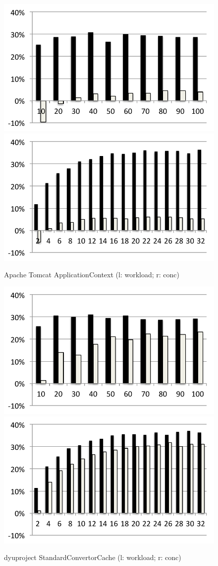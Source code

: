 \begin{figure}
	\begin{minipage}{0.50 \textwidth}
		\includegraphics[width=0.5 \textwidth]{../../eval/32threads/case1it.pdf}\includegraphics[width=0.5 \textwidth]{../../eval/32threads/case1th.pdf}
		\caption{\label{Fi:case1th}Apache Tomcat {\sf ApplicationContext} (l: workload; r: conc)\vspace{10pt}}
	\end{minipage}
	\hfill
	\begin{minipage}{0.5 \textwidth}
		\includegraphics[width=0.5 \textwidth]{../../eval/32threads/case2it.pdf}\includegraphics[width=0.5 \textwidth]{../../eval/32threads/case2th.pdf}
		\caption{\label{Fi:case2th}dyuproject {\sf StandardConvertorCache} 
			(l: workload; r: conc)\vspace{10pt}}
	\end{minipage}

\end{figure}
